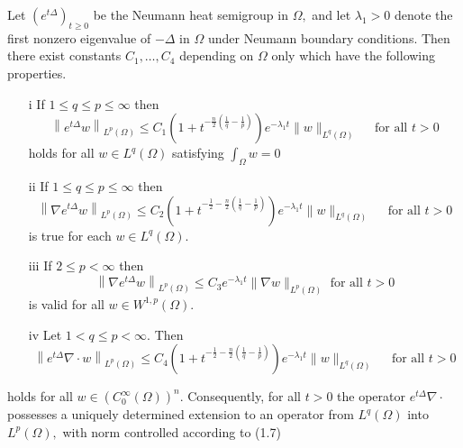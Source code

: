 \begin{lemma}
	 Let $\left(e^{t \Delta}\right)_{t \geqslant 0}$ be the Neumann heat semigroup in $\Omega,$ and let $\lambda_{1}>0$ denote the first nonzero eigenvalue of $-\Delta$ in $\Omega$ under Neumann boundary conditions. Then there exist constants $C_{1}, \ldots, C_{4}$ depending on $\Omega$ only which have the following properties.
	 \begin{itemize}
	 	\item [i] If $1 \leqslant q \leqslant p \leqslant \infty$ then
	$$
	\left\|e^{t \Delta} w\right\|_{L^{p}(\Omega)} \leqslant C_{1}\left(1+t^{-\frac{n}{2}\left(\frac{1}{q}-\frac{1}{p}\right)}\right) e^{-\lambda_{1} t}\|w\|_{L^{q}(\Omega)} \quad \text { for all } t>0
	$$
	holds for all $w \in L^{q}(\Omega)$ satisfying $\int_{\Omega} w=0$
	\item [ii] If $1 \leqslant q \leqslant p \leqslant \infty$ then
	$$
	\left\|\nabla e^{t \Delta} w\right\|_{L^{p}(\Omega)} \leqslant C_{2}\left(1+t^{-\frac{1}{2}-\frac{n}{2}\left(\frac{1}{q}-\frac{1}{p}\right)}\right) e^{-\lambda_{1} t}\|w\|_{L^{q}(\Omega)} \quad \text { for all } t>0
	$$
	is true for each $w \in L^{q}(\Omega)$.
	\item [iii] If $2 \leqslant p<\infty$ then
	$$
	\left\|\nabla e^{t \Delta} w\right\|_{L^{p}(\Omega)} \leqslant C_{3} e^{-\lambda_{1} t}\|\nabla w\|_{L^{p}(\Omega)} \text { for all } t>0
	$$
	is valid for all $w \in W^{1, p}(\Omega)$.
	\item [iv] Let $1<q \leqslant p<\infty .$ Then
	$$
	\left\|e^{t \Delta} \nabla \cdot w\right\|_{L^{p}(\Omega)} \leqslant C_{4}\left(1+t^{-\frac{1}{2}-\frac{n}{2}\left(\frac{1}{q}-\frac{1}{p}\right)}\right) e^{-\lambda_{1} t}\|w\|_{L^{q}(\Omega)} \quad \text { for all } t>0
	$$
	 \end{itemize}
	holds for all $w \in\left(C_{0}^{\infty}(\Omega)\right)^{n} .$ Consequently, for all $t>0$ the operator $e^{t \Delta} \nabla \cdot$ possesses a uniquely determined extension to an operator from $L^{q}(\Omega)$ into $L^{p}(\Omega),$ with norm controlled according to (1.7)
	
\end{lemma}
